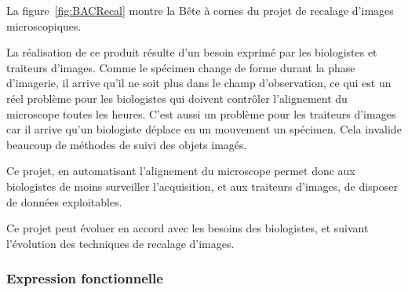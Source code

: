 La figure~\ref{fig:BACRecal} montre la Bête à cornes du projet de recalage d'images microscopiques.

La réalisation de ce produit résulte d'un besoin exprimé par les biologistes et traiteurs d'images.
Comme le spécimen change de forme durant la phase d'imagerie, il arrive qu'il ne soit plus dans le champ d'observation, ce qui est un réel problème pour les biologistes qui doivent contrôler l'alignement du microscope toutes les heures.
C'est aussi un problème pour les traiteurs d'images
car il arrive qu'un biologiste déplace en un mouvement un spécimen.
Cela invalide beaucoup de méthodes de suivi des objets imagés.

Ce projet, en automatisant l'alignement du microscope permet donc aux biologistes de moins surveiller l'acquisition,
et aux traiteurs d'images, de disposer de données exploitables.

Ce projet peut évoluer en accord avec les besoins des biologistes, et suivant l'évolution des techniques de recalage d'images.


\newpage
\subsubsection{Expression fonctionnelle}

